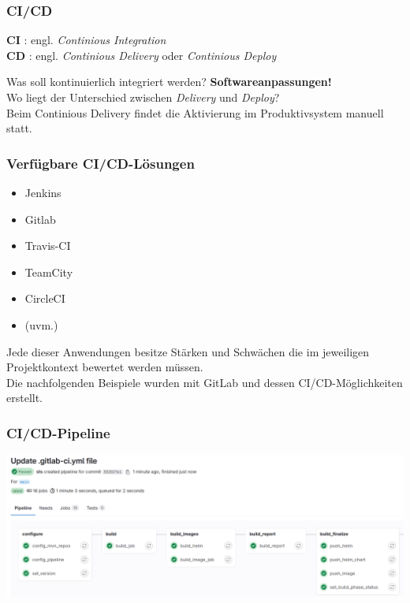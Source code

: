 \begin{frame}
\frametitle{CI/CD}

\begin{definition}
	\textbf{CI} : engl. \textit{Continious Integration}\\
	\textbf{CD} : engl. \textit{Continious Delivery} oder \textit{Continious Deploy} 
\end{definition}

\pause
Was soll kontinuierlich integriert werden?
\pause
\textbf{Softwareanpassungen!}\\
\pause 
Wo liegt der Unterschied zwischen \textit{Delivery} und \textit{Deploy}?\\
\pause
Beim Continious Delivery findet die Aktivierung im Produktivsystem manuell statt. 

\end{frame}

\begin{frame}
	\frametitle{Verfügbare CI/CD-Lösungen}
	\begin{itemize}
		\item Jenkins
		\item Gitlab 
		\item Travis-CI
		\item TeamCity
		\item CircleCI
		\item (uvm.)
	\end{itemize}
	Jede dieser Anwendungen besitze Stärken und Schwächen die im jeweiligen Projektkontext bewertet werden müssen. \\
	
	Die nachfolgenden Beispiele wurden mit GitLab und dessen CI/CD-Möglichkeiten erstellt.
\end{frame}

\begin{frame}
	\frametitle{CI/CD-Pipeline}
	\begin{center}
		\includegraphics[width=1.0\textwidth]{img/CI_CD_Example.png}
	\end{center}
\end{frame}